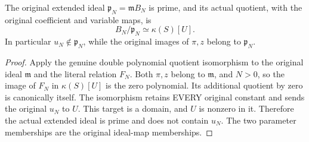 \begin{lemma}
\label{lem:gauss-regular-surface-chart-closed-prime}
\leanok
The original extended ideal $\mathfrak p_N=\mathfrak mB_N$ is prime, and its
actual quotient, with the original coefficient and variable maps, is
\[
 B_N/\mathfrak p_N\simeq\kappa(S)[U].
\]
In particular $u_N\notin\mathfrak p_N$, while the original images of $\pi,z$
belong to $\mathfrak p_N$.
\end{lemma}
\begin{proof}
Apply the genuine double polynomial quotient isomorphism to the original
ideal $\mathfrak m$ and the literal relation $F_N$. Both $\pi,z$ belong to
$\mathfrak m$, and $N>0$, so the image of $F_N$ in $\kappa(S)[U]$ is the zero
polynomial. Its additional quotient by zero is canonically itself. The
isomorphism retains EVERY original constant and sends the original $u_N$ to
$U$. This target is a domain, and $U$ is nonzero in it. Therefore the actual
extended ideal is prime and does not contain $u_N$. The two parameter
memberships are the original ideal-map memberships.
\end{proof}

